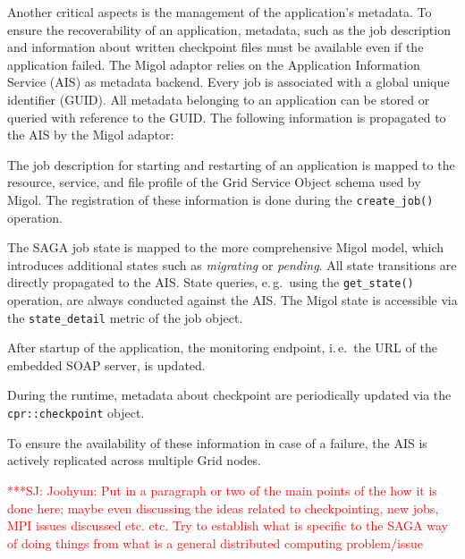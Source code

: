 \documentclass[times, 10pt,twocolumn]{article}
\newcommand{\jhanote}[1]{ {\textcolor{red} { ***SJ: #1 }}}
\newcommand{\jhanote}[1]{}
\begin{document}
Another critical aspects is the management of the application's metadata. To ensure the recoverability 
of an application, metadata, such as the job description and information about written checkpoint files 
must be available even if the application failed. The Migol adaptor relies on the Application 
Information Service (AIS) as metadata backend. Every job is associated with a global unique identifier (GUID).
All metadata belonging to an application can be stored or queried with reference to the GUID. 
The following information is propagated to the AIS by the Migol adaptor:
\begin{compactitem}
    \item The job description for starting and restarting of an application is mapped to the resource, service, and file profile of the Grid Service Object schema used by Migol. The registration of these information is done during the \texttt{create\_job()} operation.
    \item The SAGA job state is mapped to the more comprehensive Migol model, which introduces additional states such as \emph{migrating} or \emph{pending}. All state transitions are directly propagated to the AIS. State queries, e.\,g.\ using the \texttt{get\_state()} operation,  are always conducted against the AIS. The Migol state is accessible via the \texttt{state\_detail} metric of the job object.
    
    \item After startup of the application, the monitoring endpoint, i.\,e.\ the URL of the embedded SOAP server, is updated.
    \item During the runtime, metadata about checkpoint are periodically updated via the \texttt{cpr::checkpoint} object.
\end{compactitem}
To ensure the availability of these information in case of a failure, the AIS is actively replicated across multiple Grid nodes.
                  



                                                  



\jhanote{Joohyun: Put in a paragraph or two of the main points of the
  how it is done here; maybe even discussing the ideas related to
  checkpointing, new jobs, MPI issues discussed etc. etc. Try to
  establish what is specific to the SAGA way of doing things from what
  is a general distributed computing problem/issue}
\end{document}
